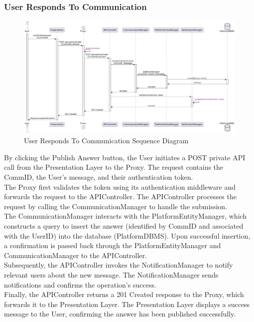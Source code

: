 \subsubsection*{User Responds To Communication}
\begin{figure}[H]
    \centering
    \includegraphics[width=\linewidth]{Latex/Images/DD/SequenceDiagrams/15UserRespondsToComm.png}
    \caption{User Responds To Communication Sequence Diagram}
    \label{fig:}
\end{figure}
By clicking the Publish Answer button, the User initiates a POST private API call from the Presentation Layer to the Proxy. The request contains the CommID, the User's message, and their authentication token.\\
The Proxy first validates the token using its authentication middleware and forwards the request to the APIController. The APIController processes the request by calling the CommunicationManager to handle the submission.\\
The CommunicationManager interacts with the PlatformEntityManager, which constructs a query to insert the answer (identified by CommID and associated with the UserID) into the database (PlatformDBMS). Upon successful insertion, a confirmation is passed back through the PlatformEntityManager and CommunicationManager to the APIController.\\
Subsequently, the APIController invokes the NotificationManager to notify relevant users about the new message. The NotificationManager sends notifications and confirms the operation's success.\\
Finally, the APIController returns a 201 Created response to the Proxy, which forwards it to the Presentation Layer. The Presentation Layer displays a success message to the User, confirming the answer has been published successfully.

